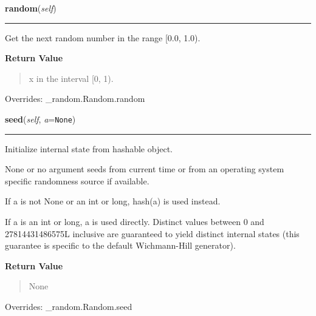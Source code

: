     \vspace{0.5ex}

\hspace{.8\funcindent}\begin{boxedminipage}{\funcwidth}

    \raggedright \textbf{random}(\textit{self})

    \vspace{-1.5ex}

    \rule{\textwidth}{0.5\fboxrule}
\setlength{\parskip}{2ex}
    Get the next random number in the range [0.0, 1.0).

\setlength{\parskip}{1ex}
      \textbf{Return Value}
    \vspace{-1ex}

      \begin{quote}
      x in the interval [0, 1).

      \end{quote}

      Overrides: \_random.Random.random

    \end{boxedminipage}

    \vspace{0.5ex}

\hspace{.8\funcindent}\begin{boxedminipage}{\funcwidth}

    \raggedright \textbf{seed}(\textit{self}, \textit{a}={\tt None})

    \vspace{-1.5ex}

    \rule{\textwidth}{0.5\fboxrule}
\setlength{\parskip}{2ex}
    Initialize internal state from hashable object.

    None or no argument seeds from current time or from an operating system
    specific randomness source if available.

    If a is not None or an int or long, hash(a) is used instead.

    If a is an int or long, a is used directly.  Distinct values between 0 
    and 27814431486575L inclusive are guaranteed to yield distinct internal
    states (this guarantee is specific to the default Wichmann-Hill 
    generator).

\setlength{\parskip}{1ex}
      \textbf{Return Value}
    \vspace{-1ex}

      \begin{quote}
      None

      \end{quote}

      Overrides: \_random.Random.seed

    \end{boxedminipage}

